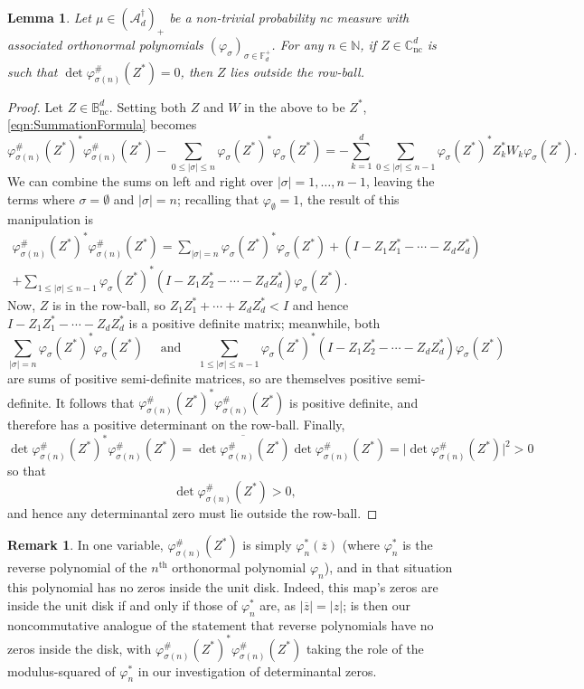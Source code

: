 \documentclass[11pt,reqno]{amsart}
\newcommand\ncm[1]{(\mathscr{A}_{#1}^{\dagger})_+}
\def\p{\varphi}
\def\s{\sigma}
\def\NN{\mathbb{N}}
\def\CC{\mathbb{C}}
\def\BB{\mathbb{B}}
\def\FF{\mathbb{F}}
\def\nc{\mathrm{nc}}
\newtheorem{lemma}[theorem]{Lemma}
\theoremstyle{definition}
\newtheorem{remark}[theorem]{Remark}
\numberwithin{equation}{section}
\begin{document}
\begin{lemma}
    \label{lem:ZerosOutside}
    Let \(\mu \in \ncm{d}\) be a non-trivial probability nc measure with associated orthonormal polynomials \((\p_\s)_{\s \in \FF_d^+}\). For any \(n \in \NN\), if \(Z \in \CC_\nc^d\) is such that \(\det \p_{\s(n)}^\#(Z^*) = 0\), then \(Z\) lies outside the row-ball.
\end{lemma}
\begin{proof}
    Let \(Z \in \BB_\nc^d\). Setting both \(Z\) and \(W\) in the above to be \(Z^*\), \eqref{eqn:SummationFormula} becomes
    \[
        \p_{\s(n)}^\#(Z^*)^* \p_{\s(n)}^\#(Z^*) - \sum_{0 \leq \lvert \s \rvert \leq n} \p_\s(Z^*)^*\p_\s(Z^*) = - \sum_{k=1}^d \sum_{0 \leq \lvert \s \rvert \leq n-1} \p_\s(Z^*)^* Z_k^* W_k \p_\s(Z^*).
    \]
    We can combine the sums on left and right over \(\lvert \s \rvert = 1, \ldots, n-1\), leaving the terms where \(\s = \emptyset\) and \(\lvert \s \rvert = n\); recalling that \(\p_{\emptyset} = 1\), the result of this manipulation is
    \begin{multline*}
        \p_{\s(n)}^\#(Z^*)^* \p_{\s(n)}^\#(Z^*) = \sum_{\lvert \s \rvert = n} \p_\s(Z^*)^* \p_\s(Z^*) + (I - Z_1Z_1^* - \cdots - Z_dZ_d^*)  \\ + \sum_{1 \leq \lvert \s \rvert \leq n-1} \p_\s(Z^*)^*(I - Z_1Z_2^* - \cdots - Z_dZ_d^*)\p_\s(Z^*).
    \end{multline*}
    Now, \(Z\) is in the row-ball, so \(Z_1Z_1^* + \cdots + Z_dZ_d^* < I\) and hence \(I - Z_1Z_1^* - \cdots - Z_dZ_d^*\) is a positive definite matrix; meanwhile, both
    \[
        \sum_{\lvert \s \rvert = n} \p_\s(Z^*)^* \p_\s(Z^*) \quad  \text{ and } \quad \sum_{1 \leq \lvert \s \rvert \leq n-1} \p_\s(Z^*)^*(I - Z_1Z_2^* - \cdots - Z_dZ_d^*)\p_\s(Z^*)
    \]
    are sums of positive semi-definite matrices, so are themselves positive semi-definite. It follows that \(\p_{\s(n)}^\#(Z^*)^* \p_{\s(n)}^\#(Z^*)\) is positive definite, and therefore has a positive determinant on the row-ball. Finally,
    \[
        \det \p_{\s(n)}^\#(Z^*)^* \p_{\s(n)}^\#(Z^*) = \overline{\det \p_{\s(n)}^\#(Z^*)}\det \p_{\s(n)}^\#(Z^*) = \lvert \det \p_{\s(n)}^\#(Z^*) \rvert^2 > 0
    \]
    so that
    \[
        \det \p_{\s(n)}^\#(Z^*) > 0,
    \]
    and hence any determinantal zero must lie outside the row-ball.
\end{proof}

\begin{remark}
    In one variable, \(\p_{\s(n)}^\#(Z^*)\) is simply \(\p_n^*(\overline{z})\) (where \(\p_n^*\) is the reverse polynomial of the \(n^{\mathrm{th}}\) orthonormal polynomial \(\p_n\)), and in that situation this polynomial has no zeros inside the unit disk. Indeed, this map's zeros are inside the unit disk if and only if those of \(\p_n^*\) are, as \(\lvert \overline{z} \rvert = \lvert z \rvert\);  is then our noncommutative analogue of the statement that reverse polynomials have no zeros inside the disk, with \(\p_{\s(n)}^\#(Z^*)^* \p_{\s(n)}^\#(Z^*)\) taking the role of the modulus-squared of \(\p_n^*\) in our investigation of determinantal zeros.
\end{remark}
\end{document}
